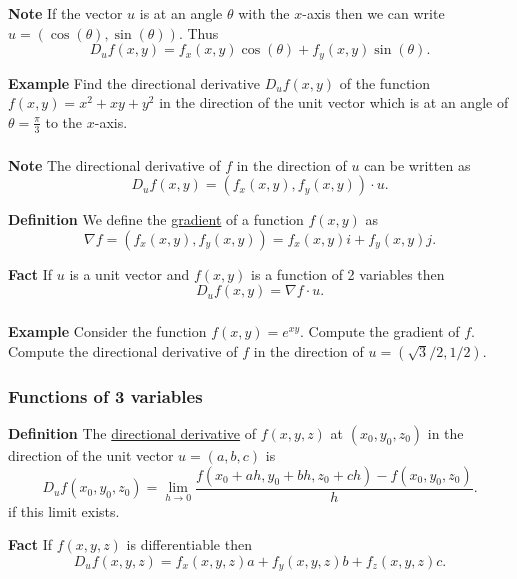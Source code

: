 \begin{frame}[fragile]\frametitle{}
\textbf{Note}
  If the vector $u$ is at an angle $\theta$ with the $x$-axis then we can write $u=(\cos(\theta),\sin(\theta))$.  Thus
  $$
    D_u f(x,y) = f_x(x,y)\cos(\theta) + f_y(x,y)\sin(\theta).
  $$


\textbf{Example}
Find the directional derivative $D_u f(x,y)$ of the function $f(x,y)=x^2+xy+y^2$ in the direction of the unit vector which is at an angle of $\theta=\frac{\pi}{3}$ to the $x$-axis.

\end{frame}


\begin{frame}[fragile]\frametitle{}
\textbf{Note}
The directional derivative of $f$ in the direction of $u$ can be written as
$$
D_u f(x,y) = (f_x(x,y), f_y(x,y)) \cdot u.
$$
  

\textbf{Definition}
We define the \underline{gradient} of a function $f(x,y)$ as
$$
\nabla f = (f_x(x,y), f_y(x,y)) = f_x(x,y)i + f_y(x,y)j.
$$
  

\textbf{Fact}
If $u$ is a unit vector and $f(x,y)$ is a function of 2 variables then
$$
D_u f(x,y) = \nabla f \cdot u.
$$

\end{frame}



\begin{frame}[fragile]\frametitle{}
\textbf{Example}
Consider the function $f(x,y)=e^{xy}$. Compute the gradient of $f$.  Compute the directional derivative of $f$ in the direction of $u=(\sqrt{3}/2,1/2)$.

\end{frame}



\begin{frame}[fragile]\frametitle{Functions of 3 variables}
 
\textbf{Definition}
 The \underline{directional derivative} of $f(x,y,z)$ at $(x_0,y_0,z_0)$ in the direction of the unit vector $u=(a,b,c)$ is
 $$
   D_u f(x_0,y_0,z_0) = \lim_{h\rightarrow 0} \frac{f(x_0+ah,y_0+bh,z_0+ch)-f(x_0,y_0,z_0)}{h}.
 $$
 if this limit exists.
 

\textbf{Fact}
 If $f(x,y,z)$ is differentiable then
 $$
 D_u f(x,y,z) = f_x(x,y,z)a +f_y(x,y,z)b + f_z(x,y,z)c.
 $$
 
\end{frame}


